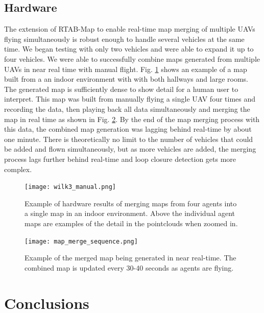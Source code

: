 \documentclass[letterpaper, 10 pt, conference]{ieeeconf}  %
\begin{document}
\subsection{Hardware}

The extension of RTAB-Map to enable real-time map merging of multiple UAVs flying simultaneously is robust enough to handle several vehicles at the same time. We began testing with only two vehicles and were able to expand it up to four vehicles. We were able to successfully combine maps generated from multiple UAVs in near real time with manual flight. Fig. \ref{fig:wilk3_map} shows an example of a map built from a an indoor environment with with both hallways and large rooms. The generated map is sufficiently dense to show detail for a human user to interpret. This map was built from manually flying a single UAV four times and recording the data, then playing back all data simultaneously and merging the map in real time as shown in Fig. \ref{fig:map_seq}. By the end of the map merging process with this data, the combined map generation was lagging behind real-time by about one minute. There is theoretically no limit to the number of vehicles that could be added and flown simultaneously, but as more vehicles are added, the merging process lags further behind real-time and loop closure detection gets more complex.

\begin{figure}
\centering
\texttt{[image: wilk3\_manual.png]}
\caption[Map generated from four combined maps in hardware manual flight.]{Example of hardware results of merging maps from four agents into a single map in an indoor environment. Above the individual agent maps are examples of the detail in the pointclouds when zoomed in.}
\label{fig:wilk3_map}
\end{figure}

\begin{figure}
\centering
\texttt{[image: map\_merge\_sequence.png]}
\caption[An example of the map merging process over time.]{Example of the merged map being generated in near real-time. The combined map is updated every 30-40 seconds as agents are flying.}
\label{fig:map_seq}
\end{figure}

\section{Conclusions}\label{nav_conclusions}
\end{document}
